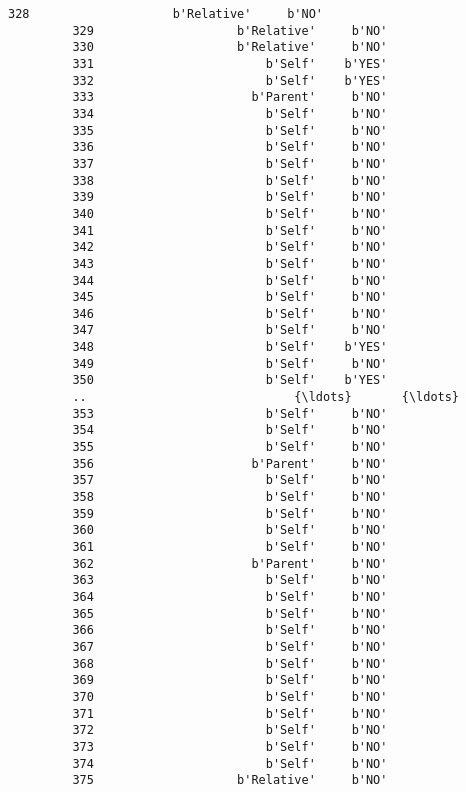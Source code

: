 \documentclass[11pt]{article}
\begin{document}
\begin{Verbatim}[commandchars=\\\{\}]
         328                    b'Relative'     b'NO'  
         329                    b'Relative'     b'NO'  
         330                    b'Relative'     b'NO'  
         331                        b'Self'    b'YES'  
         332                        b'Self'    b'YES'  
         333                      b'Parent'     b'NO'  
         334                        b'Self'     b'NO'  
         335                        b'Self'     b'NO'  
         336                        b'Self'     b'NO'  
         337                        b'Self'     b'NO'  
         338                        b'Self'     b'NO'  
         339                        b'Self'     b'NO'  
         340                        b'Self'     b'NO'  
         341                        b'Self'     b'NO'  
         342                        b'Self'     b'NO'  
         343                        b'Self'     b'NO'  
         344                        b'Self'     b'NO'  
         345                        b'Self'     b'NO'  
         346                        b'Self'     b'NO'  
         347                        b'Self'     b'NO'  
         348                        b'Self'    b'YES'  
         349                        b'Self'     b'NO'  
         350                        b'Self'    b'YES'  
         ..                             {\ldots}       {\ldots}  
         353                        b'Self'     b'NO'  
         354                        b'Self'     b'NO'  
         355                        b'Self'     b'NO'  
         356                      b'Parent'     b'NO'  
         357                        b'Self'     b'NO'  
         358                        b'Self'     b'NO'  
         359                        b'Self'     b'NO'  
         360                        b'Self'     b'NO'  
         361                        b'Self'     b'NO'  
         362                      b'Parent'     b'NO'  
         363                        b'Self'     b'NO'  
         364                        b'Self'     b'NO'  
         365                        b'Self'     b'NO'  
         366                        b'Self'     b'NO'  
         367                        b'Self'     b'NO'  
         368                        b'Self'     b'NO'  
         369                        b'Self'     b'NO'  
         370                        b'Self'     b'NO'  
         371                        b'Self'     b'NO'  
         372                        b'Self'     b'NO'  
         373                        b'Self'     b'NO'  
         374                        b'Self'     b'NO'  
         375                    b'Relative'     b'NO'  

\end{Verbatim}
\end{document}
